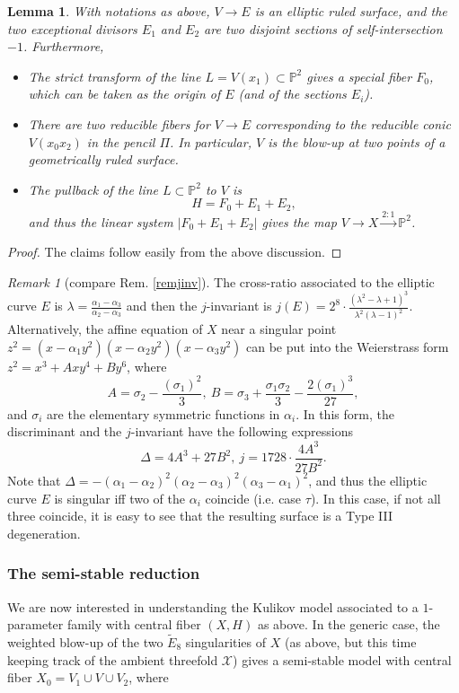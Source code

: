\documentclass{amsart}
\numberwithin{equation}{section}
\theoremstyle{plain}
\newtheorem{lemma}[equation]{Lemma}
\theoremstyle{remark}
\newtheorem{remark}[equation]{Remark}
\theoremstyle{definition}
\newcommand{\bP}{\mathbb{P}}
\newcommand{\sX}{\mathscr{X}}
\newcommand{\Ee}{\widetilde{E}_8}
\begin{document}
\begin{lemma}
With notations as above, $V\to E$  is an elliptic ruled surface, and the two 
exceptional divisors $E_1$ and $E_2$ are two disjoint sections of self-intersection $-1$. Furthermore, 
\begin{itemize} 
\item[i)] The strict transform of the line $L=V(x_1)\subset \bP^2$ gives a special fiber $F_0$, which can be taken as the origin of $E$ (and of the sections $E_i$).
\item[ii)] There are two reducible fibers for $V\to E$ corresponding to the reducible conic $V(x_0x_2)$ in the pencil $\Pi$. In particular, $V$ is the blow-up at two points of a geometrically ruled surface. 
\item[iii)] The pullback of the line $L\subset \bP^2$ to $V$ is 
$$H=F_0+E_1+E_2,$$ and thus the linear system $|F_0+E_1+E_2|$ gives the map $ V\to X\xrightarrow{2:1}\bP^2$. 
\end{itemize}
\end{lemma}
\begin{proof}The claims follow easily from the above discussion.\end{proof}
\begin{remark}[compare Rem. \ref{remjinv}]
The cross-ratio associated to the elliptic curve $E$ is $\lambda=\frac{\alpha_1-\alpha_3}{\alpha_2-\alpha_3}$ and then the $j$-invariant is
$
j(E)=2^8\cdot \frac{(\lambda^2-\lambda+1)^3}{\lambda^2(\lambda-1)^2}$.
Alternatively, the affine equation of $X$ near a singular point 
$
z^2=(x-\alpha_1y^2)(x-\alpha_2y^2)(x-\alpha_3y^2)$
can be put into the Weierstrass form $z^2=x^3+Axy^4+By^6$,  where
$$
A=\sigma_2-\frac{(\sigma_1)^2}{3},\ B=\sigma_3+\frac{\sigma_1\sigma_2}{3}-\frac{2(\sigma_1)^3}{27},$$
and $\sigma_i$ are the elementary symmetric functions in $\alpha_i$. 
In this form, the discriminant and the $j$-invariant have the following expressions 
$$
\Delta=4A^3+27B^2,\ j=1728\cdot\frac{4A^3}{27B^2}.$$
Note that $\Delta=-(\alpha_1-\alpha_2)^2(\alpha_2-\alpha_3)^2(\alpha_3-\alpha_1)^2$, and thus the elliptic curve $E$ is singular iff two of the $\alpha_i$ coincide (i.e.  case $\tau$). In this case, if not all three coincide, it is easy to see that the resulting surface is a Type III degeneration. 
\end{remark}

\subsubsection{The semi-stable reduction}
We are now interested in understanding the Kulikov model associated to a $1$-parameter family with central fiber $(X,H)$ as above. In the generic case, the weighted blow-up of the two $\Ee$ singularities of $X$ (as above, but this time keeping track of the ambient threefold $\sX$) gives a semi-stable model with central fiber $X_0=V_1\cup V\cup V_2$, where 
\end{document}
